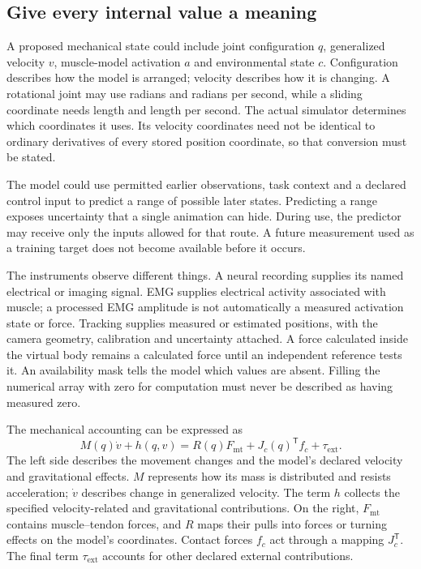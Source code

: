 \subsection{Give every internal value a meaning}

A proposed mechanical state could include joint configuration $q$, generalized velocity $v$, muscle-model activation $a$ and environmental state $c$. Configuration describes how the model is arranged; velocity describes how it is changing. A rotational joint may use radians and radians per second, while a sliding coordinate needs length and length per second. The actual simulator determines which coordinates it uses. Its velocity coordinates need not be identical to ordinary derivatives of every stored position coordinate, so that conversion must be stated.

The model could use permitted earlier observations, task context and a declared control input to predict a range of possible later states. Predicting a range exposes uncertainty that a single animation can hide. During use, the predictor may receive only the inputs allowed for that route. A future measurement used as a training target does not become available before it occurs.

The instruments observe different things. A neural recording supplies its named electrical or imaging signal. EMG supplies electrical activity associated with muscle; a processed EMG amplitude is not automatically a measured activation state or force. Tracking supplies measured or estimated positions, with the camera geometry, calibration and uncertainty attached. A force calculated inside the virtual body remains a calculated force until an independent reference tests it. An availability mask tells the model which values are absent. Filling the numerical array with zero for computation must never be described as having measured zero.

The mechanical accounting can be expressed as
\[
M(q)\dot v+h(q,v)
 =R(q)F_{\mathrm{mt}}+J_c(q)^{\mathsf T}f_c+\tau_{\mathrm{ext}}.
\]
The left side describes the movement changes and the model's declared velocity and gravitational effects. $M$ represents how its mass is distributed and resists acceleration; $\dot v$ describes change in generalized velocity. The term $h$ collects the specified velocity-related and gravitational contributions. On the right, $F_{\mathrm{mt}}$ contains muscle--tendon forces, and $R$ maps their pulls into forces or turning effects on the model's coordinates. Contact forces $f_c$ act through a mapping $J_c^{\mathsf T}$. The final term $\tau_{\mathrm{ext}}$ accounts for other declared external contributions.

